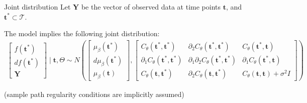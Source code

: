 \documentclass[ignorenonframetext,xcolor=pdflatex,table,dvipsnames,serif]{beamer}
\begin{document}
\begin{frame}{Joint distribution}
Let $\mathbf{Y}$ be the vector of observed data at time points $\mathbf{t}$, and $\mathbf{t}^\ast \subset \mathcal{T}$.

\vspace{1cm}

The model implies the following joint distribution:
{\scriptsize
\begin{align*}
  \begin{bmatrix}f(\mathbf{t}^\ast)\\ df(\mathbf{t}^\ast)\\ \mathbf{Y}\end{bmatrix} \mid \mathbf{t}, \Theta \sim N\left(\begin{bmatrix}\mu_\beta(\mathbf{t}^\ast)\\ d\mu_\beta(\mathbf{t}^\ast)\\ \mu_\beta(\mathbf{t})\end{bmatrix}, \begin{bmatrix}C_\theta(\mathbf{t}^\ast,\mathbf{t}^\ast) & \partial_2 C_\theta(\mathbf{t}^\ast, \mathbf{t}^\ast) & C_\theta(\mathbf{t}^\ast, \mathbf{t})\\ \partial_1 C_\theta(\mathbf{t}^\ast, \mathbf{t}^\ast) &  \partial_1 \partial_2 C_\theta(\mathbf{t}^\ast, \mathbf{t}^\ast) & \partial_1 C_\theta(\mathbf{t}^\ast, \mathbf{t})\\ C_\theta(\mathbf{t}, \mathbf{t}^\ast) & \partial_2 C_\theta(\mathbf{t}, \mathbf{t}^\ast) & C_\theta(\mathbf{t}, \mathbf{t}) + \sigma^2 I\end{bmatrix}\right)
\end{align*}
}%

(sample path regularity conditions are implicitly assumed)
\end{frame}
\end{document}
